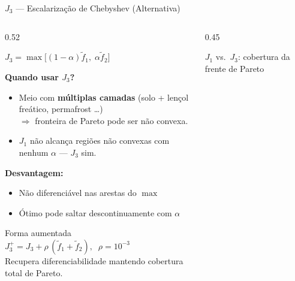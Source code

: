 \documentclass[aspectratio=169, 10pt]{beamer}
\begin{document}
\begin{frame}{$J_3$ --- Escalarização de Chebyshev (Alternativa)}
  \begin{columns}[T]
    \begin{column}{0.52\textwidth}
      \begin{block}{}
        \centering
        \large
        $J_3 = \max\!\bigl[(1{-}\alpha)\tilde{f}_1,\;\alpha\tilde{f}_2\bigr]$
      \end{block}
      \vspace{0.5em}
      \textbf{Quando usar $J_3$?}
      \begin{itemize}
        \item Meio com \textbf{múltiplas camadas} (solo + lençol freático,
              permafrost \ldots)\\
              $\Rightarrow$ fronteira de Pareto pode ser \alert{não convexa}.
        \item $J_1$ não alcança regiões não convexas com nenhum $\alpha$ ---
              $J_3$ sim.
      \end{itemize}
      \vspace{0.5em}
      \textbf{Desvantagem:}
      \begin{itemize}
        \item Não diferenciável nas arestas do $\max$
        \item Ótimo pode saltar descontinuamente com $\alpha$
      \end{itemize}
      \vspace{0.3em}
      \begin{block}{Forma aumentada}
        \small
        $J_3^{+} = J_3 + \rho\,(\tilde{f}_1 + \tilde{f}_2),\;\;
        \rho = 10^{-3}$\\
        Recupera diferenciabilidade mantendo cobertura total de Pareto.
      \end{block}
    \end{column}
    \begin{column}{0.45\textwidth}
      \begin{block}{$J_1$ vs.\ $J_3$: cobertura da frente de Pareto}
        \centering
\end{block}
\end{column}
\end{columns}
\end{frame}
\end{document}
